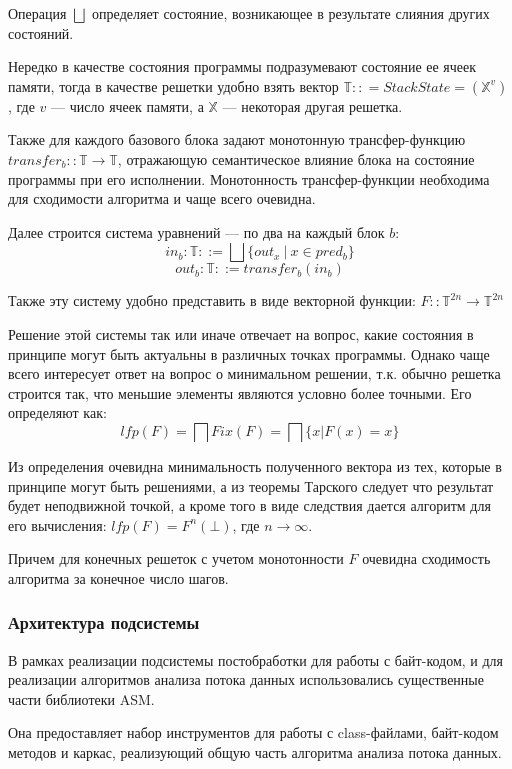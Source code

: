 Операция $\bigsqcup$ определяет состояние, возникающее в результате слияния других состояний.

Нередко в качестве состояния программы подразумевают состояние ее ячеек памяти, тогда в качестве
решетки удобно взять вектор $\mathbb{T} :: = StackState = (\mathbb{X}^v)$, где $v$ --- число ячеек
памяти, а $\mathbb{X}$ --- некоторая другая решетка.

Также для каждого базового блока задают монотонную трансфер-функцию
$transfer_b :: \mathbb{T} \to \mathbb{T}$, отражающую семантическое влияние блока на состояние программы
при его исполнении.
Монотонность трансфер-функции необходима для сходимости алгоритма и чаще всего очевидна.

Далее строится система уравнений --- по два на каждый блок $b$:
$$in_b: \mathbb{T} ::= \bigsqcup \{out_x\ |\ x \in pred_b\}$$
$$out_b: \mathbb{T} ::= transfer_b(in_b)$$

Также эту систему удобно представить в виде векторной функции: $F :: \mathbb{T}^{2n} \to \mathbb{T}^{2n}$

Решение этой системы так или иначе отвечает на вопрос, какие состояния в принципе могут быть
актуальны в различных точках программы.
Однако чаще всего интересует ответ на вопрос о минимальном решении, т.к. обычно решетка строится
так, что меньшие элементы являются условно более точными.
Его определяют как:
$$lfp(F) = \bigsqcap Fix(F) =  \bigsqcap\{ x | F(x)= x\}$$

Из определения очевидна минимальность полученного вектора из тех, которые в принципе могут быть
решениями, а из теоремы Тарского следует что результат будет неподвижной точкой, а кроме
того в виде следствия дается алгоритм для его вычисления: $lfp(F) = F^n(\bot)$, где $n \to \infty$.

Причем для конечных решеток с учетом монотонности $F$ очевидна сходимость алгоритма за конечное
число шагов.

\subsubsection{Архитектура подсистемы}
В рамках реализации подсистемы постобработки для работы с байт-кодом, и для реализации алгоритмов
анализа потока данных использовались существенные части библиотеки ASM.

Она предоставляет набор инструментов для работы с class-файлами, байт-кодом методов и каркас,
реализующий общую часть алгоритма анализа потока данных.

